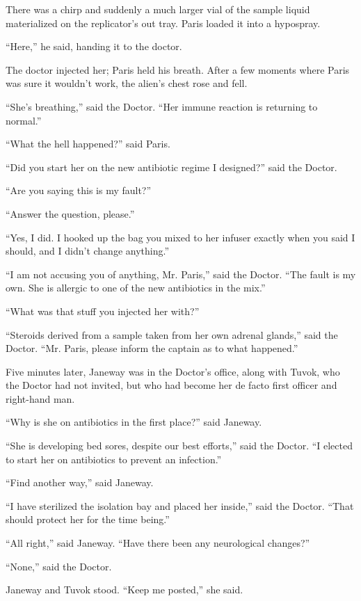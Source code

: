 \documentclass[twoside,letterpaper,12pt]{memoir}
\begin{document}
There was a chirp and suddenly a much larger vial of the sample liquid materialized on the replicator's out tray. Paris loaded it into a hypospray. 

``Here,'' he said, handing it to the doctor. 

The doctor injected her; Paris held his breath. After a few moments where Paris was sure it wouldn't work, the alien's chest rose and fell. 

``She's breathing,'' said the Doctor. ``Her immune reaction is returning to normal.'' 

``What the hell happened?'' said Paris. 

``Did you start her on the new antibiotic regime I designed?'' said the Doctor. 

``Are you saying this is my fault?'' 

``Answer the question, please.'' 

``Yes, I did. I hooked up the bag you mixed to her infuser exactly when you said I should, and I didn't change anything.'' 

``I am not accusing you of anything, Mr. Paris,'' said the Doctor. ``The fault is my own. She is allergic to one of the new antibiotics in the mix.'' 

``What was that stuff you injected her with?'' 

``Steroids derived from a sample taken from her own adrenal glands,'' said the Doctor. ``Mr. Paris, please inform the captain as to what happened.'' 

Five minutes later, Janeway was in the Doctor's office, along with Tuvok, who the Doctor had not invited, but who had become her de facto first officer and right-hand man.

``Why is she on antibiotics in the first place?'' said Janeway. 

``She is developing bed sores, despite our best efforts,'' said the Doctor. ``I elected to start her on antibiotics to prevent an infection.'' 

``Find another way,'' said Janeway. 

``I have sterilized the isolation bay and placed her inside,'' said the Doctor. ``That should protect her for the time being.'' 

``All right,'' said Janeway. ``Have there been any neurological changes?'' 

``None,'' said the Doctor. 

Janeway and Tuvok stood. ``Keep me posted,'' she said. 
\end{document}
